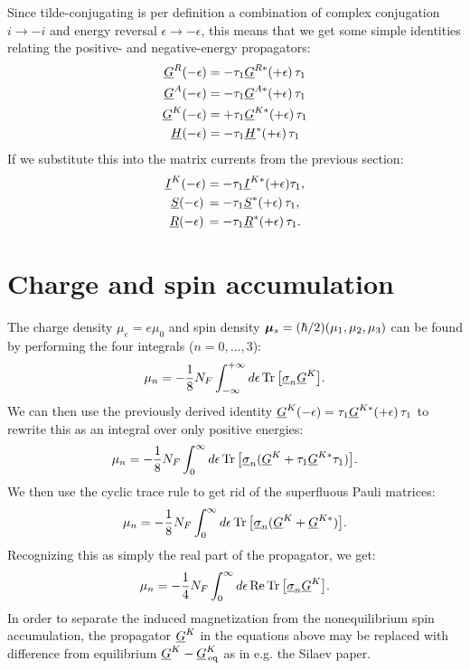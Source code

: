 Since tilde-conjugating is per definition a combination of complex conjugation $i \rightarrow -i$ and energy reversal $\epsilon \rightarrow -\epsilon$, this means that we get some simple identities relating the positive- and negative-energy propagators:
\begin{align}
  \underline{G}^R(-\epsilon) &= -\tau_{1}\underline{G}^{R*}(+\epsilon)\,\tau_{1} \\
  \underline{G}^A(-\epsilon) &= -\tau_{1}\underline{G}^{A*}(+\epsilon)\,\tau_{1} \\
  \underline{G}^K(-\epsilon) &= +\tau_{1}\underline{G}^{K*}(+\epsilon)\,\tau_{1} \\
  \underline{H}(-\epsilon)   &= -\tau_{1}\underline{H}^{*}(+\epsilon) \,\tau_{1}
\end{align}
If we substitute this into the matrix currents from the previous section:
\begin{align}
  \underline{I}^K(-\epsilon) &= -\tau_{1} \underline{I}^{K*}(+\epsilon)\tau_{1}, \\
  \underline{S}(-\epsilon)\, &= -\tau_{1} \underline{S}^*(+\epsilon)\, \tau_{1}, \\
  \underline{R}(-\epsilon)\, &= -\tau_{1} \underline{R}^*(+\epsilon)\, \tau_{1}.
\end{align}


\clearpage
\section{Charge and spin accumulation}
The charge density $\mu_e = e\mu_0$ and spin density $\bm{\mu}_s = (\hbar/2)(\mu_1, \mu_2, \mu_3)$ can be found by performing the four integrals ($n=0,\ldots,3$):
\begin{equation}
  \mu_n = -\frac{1}{8}N_F  \int_{-\infty}^{+\infty} d\epsilon \operatorname{Tr}\big[ \underline{\sigma}_{n} \underline{G}^K \big].
\end{equation}
We can then use the previously derived identity $\underline{G}^K(-\epsilon) = \tau_{1} \underline{G}^{K*}(+\epsilon) \,\tau_{1}$ to rewrite this as an integral over only positive energies:
\begin{equation}
  \mu_n = -\frac{1}{8}N_F  \int_{0}^{\infty} d\epsilon \operatorname{Tr}\big[ \underline{\sigma}_{n} (\underline{G}^K + \tau_{1} \underline{G}^{K*} \tau_{1})\big].
\end{equation}
We then use the cyclic trace rule to get rid of the superfluous Pauli matrices:
\begin{equation}
  \mu_n = -\frac{1}{8}N_F  \int_{0}^{\infty} d\epsilon \operatorname{Tr}\big[ \underline{\sigma}_{n} (\underline{G}^K + \underline{G}^{K*})\big].
\end{equation}
Recognizing this as simply the real part of the propagator, we get:
\begin{equation}
  \mu_n = -\frac{1}{4}N_F  \int_{0}^{\infty} d\epsilon \operatorname{Re}\operatorname{Tr}\big[ \underline{\sigma}_{n} \underline{G}^K \big].
\end{equation}
In order to separate the induced magnetization from the nonequilibrium spin accumulation, the propagator $\underline{G}^K$ in the equations above may be replaced with difference from equilibrium $\underline{G}^K-\underline{G}^K_\text{\,eq}$ as in e.g. the Silaev paper.

